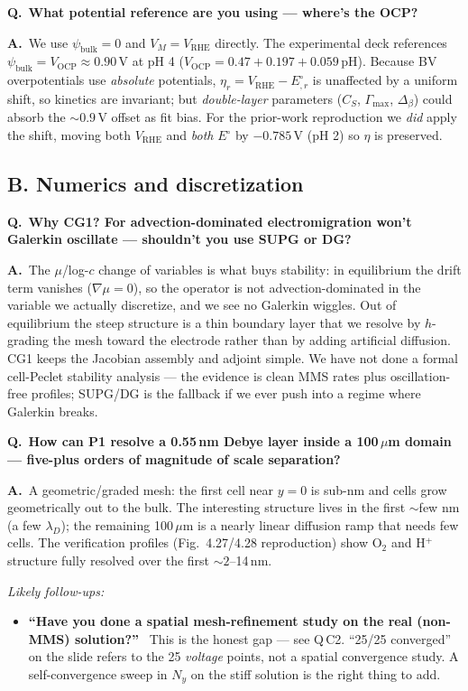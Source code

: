 \documentclass[11pt]{article}
\newcommand{\Eeq}{E^{\circ}}
\newcommand{\VRHE}{V_{\mathrm{RHE}}}
\newcommand{\CS}{C_{S}}
\newcommand{\bulk}{\mathrm{bulk}}
\newcommand{\Q}[1]{\medskip\par\noindent\textcolor{qcol}{\textbf{Q.}}\ \textbf{#1}\par\nopagebreak\smallskip}
\newcommand{\A}{\noindent\textbf{A.}\ \ignorespaces}
\newenvironment{followups}{\par\smallskip\noindent\emph{Likely follow-ups:}\begin{itemize}[leftmargin=1.6em,topsep=1pt]}{\end{itemize}}
\newcommand{\fu}[1]{\item \textbf{``#1''}\ }
\begin{document}
\Q{What potential reference are you using --- where's the OCP?}
\A We use $\psi_{\bulk}=0$ and $V_M=\VRHE$ directly. The experimental deck
references $\psi_{\bulk}=V_{\mathrm{OCP}}\approx0.90$\,V at pH 4
($V_{\mathrm{OCP}}=0.47+0.197+0.059\,\mathrm{pH}$). Because BV
overpotentials use \emph{absolute} potentials, $\eta_r=\VRHE-\Eeq_{,r}$ is
unaffected by a uniform shift, so kinetics are invariant; but
\emph{double-layer} parameters ($\CS$, $\Gamma_{\max}$, $\Delta_\beta$) could
absorb the $\sim0.9$\,V offset as fit bias. For the prior-work reproduction
we \emph{did} apply the shift, moving both $\VRHE$ and \emph{both} $\Eeq$ by
$-0.785$\,V (pH 2) so $\eta$ is preserved.

\subsection*{B. Numerics and discretization}

\Q{Why CG1? For advection-dominated electromigration won't Galerkin
oscillate --- shouldn't you use SUPG or DG?}
\A The $\mu$/log-$c$ change of variables is what buys stability: in
equilibrium the drift term vanishes ($\nabla\mu=0$), so the operator is not
advection-dominated in the variable we actually discretize, and we see no
Galerkin wiggles. Out of equilibrium the steep structure is a thin boundary
layer that we resolve by $h$-grading the mesh toward the electrode rather
than by adding artificial diffusion. CG1 keeps the Jacobian assembly and
adjoint simple. We have not done a formal cell-Peclet stability analysis ---
the evidence is clean MMS rates plus oscillation-free profiles; SUPG/DG is
the fallback if we ever push into a regime where Galerkin breaks.

\Q{How can P1 resolve a 0.55\,nm Debye layer inside a 100\,$\mu$m domain ---
five-plus orders of magnitude of scale separation?}
\A A geometric/graded mesh: the first cell near $y=0$ is sub-nm and cells
grow geometrically out to the bulk. The interesting structure lives in the
first $\sim$few nm (a few $\lambda_D$); the remaining 100\,$\mu$m is a nearly
linear diffusion ramp that needs few cells. The verification profiles
(Fig.\ 4.27/4.28 reproduction) show O$_2$ and H$^+$ structure fully resolved
over the first $\sim2$--14\,nm.
\begin{followups}
\fu{Have you done a spatial mesh-refinement study on the real
(non-MMS) solution?} This is the honest gap --- see Q\,C2. ``25/25
converged'' on the slide refers to the 25 \emph{voltage} points, not a
spatial convergence study. A self-convergence sweep in $N_y$ on the stiff
solution is the right thing to add.
\end{followups}
\end{document}
